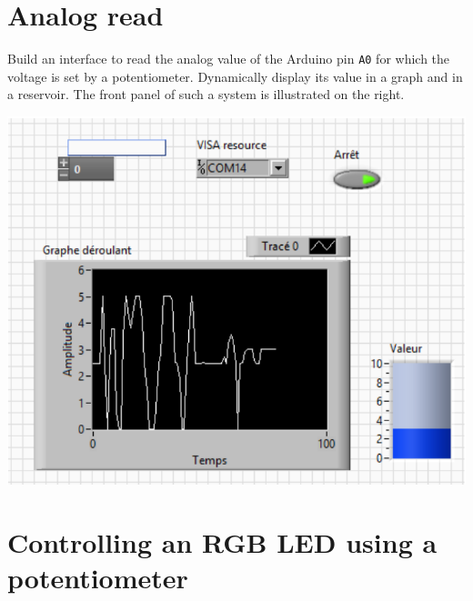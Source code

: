 \documentclass{labo}
\begin{document}
\section{Analog read}

\begin{minipage}{.4\textwidth}
Build an interface to read the analog value of the Arduino pin \texttt{A0} for which the voltage is set by a potentiometer.
Dynamically display its value in a graph and in a reservoir.
The front panel of such a system is illustrated on the right.
\end{minipage}
\hfill
\begin{minipage}{.5\textwidth}
\includegraphics[width=\textwidth]{front-panel-analog.png}
\end{minipage}



\section{Controlling an RGB LED using a potentiometer}
\end{document}
